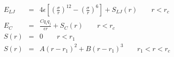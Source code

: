 


\begin{eqnarray*}
E_{LJ} & = & 4 \epsilon \left[ \left(\frac{\sigma}{r}\right)^{12} - 
                       \left(\frac{\sigma}{r}\right)^6 \right] + S_{LJ}(r)
                       \qquad r < r_c \\
E_C & = & \frac{C q_i q_j}{\epsilon  r} + S_C(r) \qquad r < r_c \\
S(r) & = & 0 \qquad r < r_1 \\
S(r) & = & A (r - r_1)^2 + B (r - r_1)^3 \qquad  r_1 < r < r_c
\end{eqnarray*}                           


